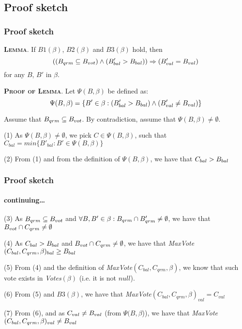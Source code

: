 \documentclass[10 pt]{beamer}
\begin{document}
\subsection{Proof sketch}


\begin{frame}
\frametitle{Proof sketch}

\textsc{\textbf{Lemma}}. If $B1(\beta)$, $B2(\beta)$ and $B3(\beta)$ hold, then $$((B_{qrm} \subseteq B_{vot}) \wedge (B'_{bal} > B_{bal})) \Rightarrow (B'_{val} = B_{val})$$ for any $B$, $B'$ in $\beta$.

\vspace{3 mm}
\textsc{\textbf{Proof of Lemma}}. Let $\Psi(B, \beta)$ be defined as: $$\Psi(B, \beta) = \{B' \in \beta : (B'_{bal} > B_{bal}) \wedge (B'_{val} \neq B_{val})\}$$


Assume that $B_{qrm} \subseteq B_{vot}$. By contradiction, assume that $\Psi(B, \beta) \neq \emptyset$.

\vspace{3 mm}
(1) As $\Psi(B, \beta) \neq \emptyset$, we pick $C \in \Psi(B, \beta)$, such that $C_{bal} = min\{B'_{bal} : B' \in \Psi(B, \beta)\}$

\vspace{2 mm}
(2) From (1) and from the definition of $\Psi(B, \beta)$, we have that $C_{bal} > B_{bal}$

\end{frame}

\begin{frame}
\frametitle{Proof sketch}
\framesubtitle{continuing\ldots}

(3) As $B_{qrm} \subseteq B_{vot}$ and $\forall B, B' \in \beta : B_{qrm} \cap B'_{qrm} \neq \emptyset$, we have that $B_{vot} \cap C_{qrm} \neq \emptyset$

\vspace{2 mm}
(4) As $C_{bal} > B_{bal}$ and $B_{vot} \cap C_{qrm} \neq \emptyset$, we have that \textit{MaxVote}$(C_{bal}, C_{qrm}, \beta)_{bal} \geq B_{bal}$

\vspace{2 mm}
(5) From (4) and the definition of \textit{MaxVote}$(C_{bal}, C_{qrm}, \beta)$, we know that such vote exists in \textit{Votes}$(\beta)$ (i.e. it is not $null$).

\vspace{2 mm}
(6) From (5) and $B3(\beta)$, we have that \textit{MaxVote}$(C_{bal}, C_{qrm}, \beta)_{val} = C_{val}$

\vspace{2 mm}
(7) From (6), and as $C_{val} \neq B_{val}$ (from $\Psi(B, \beta$)), we have that \textit{MaxVote}$(C_{bal}, C_{qrm}, \beta)_{val} \neq B_{val}$

\end{frame}
\end{document}
